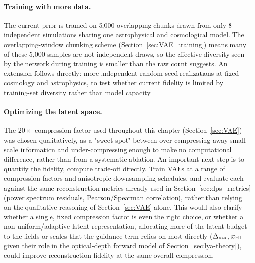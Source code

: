 \paragraph{Training with more data.} The current prior is trained on 5,000 overlapping chunks drawn from only 8 independent simulations sharing one astrophysical and cosmological model. The overlapping-window chunking scheme (Section~\ref{sec:VAE_training}) means many of these 5,000 samples are not independent draws, so the effective diversity seen by the network during training is smaller than the raw count suggests. An extension follows directly: more independent random-seed realizations at fixed cosmology and astrophysics, to test whether current fidelity is limited by training-set diversity rather than model capacity

\paragraph{Optimizing the latent space.} The $20\times$ compression factor used throughout this chapter (Section~\ref{sec:VAE}) was chosen qualitatively, as a "sweet spot" between over-compressing away small-scale information and under-compressing enough to make no computational difference, rather than from a systematic ablation. An important next step is to quantify the fidelity, compute trade-off directly. Train VAEs at a range of compression factors and anisotropic downsampling schedules, and evaluate each against the same reconstruction metrics already used in Section~\ref{sec:dps_metrics} (power spectrum residuals, Pearson/Spearman correlation), rather than relying on the qualitative reasoning of Section~\ref{sec:VAE} alone. This would also clarify whether a single, fixed compression factor is even the right choice, or whether a non-uniform/adaptive latent representation, allocating more of the latent budget to the fields or scales that the guidance term relies on most directly ($\Delta_{\rm gas}$, $x_{\rm HI}$ given their role in the optical-depth forward model of Section~\ref{sec:lya-theory}), could improve reconstruction fidelity at the same overall compression.

